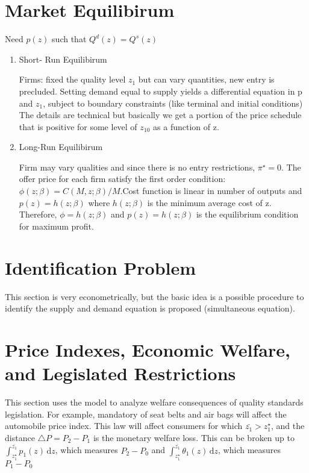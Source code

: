 \documentclass[11pt]{article}
\begin{document}
\section{Market Equilibirum}
Need $p\left(z\right)$ such that $ Q^{d}\left(z\right) = Q^{s}\left(z\right)$
\begin{enumerate} [A]
	\item Short- Run Equilibirum
	
	Firms: fixed the quality level $z_1$ but can vary quantities, new entry is precluded. 
	Setting demand equal to supply yields a differential equation in p and $z_1$, subject to boundary constraints (like terminal and initial conditions)
	The details are technical but basically we get a portion of the price schedule that is positive for some level of $z_{10}$ as a function of z.
	
	\item Long-Run Equilibirum
	
	Firm may vary qualities and since there is no entry restrictions, $\pi^{\star} = 0$. The offer price for each firm satisfy the first order condition: $\phi \left(z;\beta\right) =  C\left( M,z;\beta\right)/M$.Cost function is linear in number of outputs and $p\left(z\right) = h\left(z;\beta\right)$ where $h\left(z;\beta\right)$ is the minimum average cost of z. Therefore, $\phi = h\left(z;\beta\right)$ and $ p\left(z\right) = h\left(z;\beta\right)$ is the equilibrium condition for maximum profit.
\end {enumerate}

\section{Identification Problem} 
This section is very econometrically, but the basic idea is a possible procedure to identify the supply and demand equation is proposed (simultaneous equation). 

\section{Price Indexes, Economic Welfare, and Legislated Restrictions}
This section uses the model to analyze welfare consequences of quality standards legislation. For example, mandatory of seat belts and air bags will affect the automobile price index. 
This law will affect consumers for which $\bar{z_1} > z_1^{\star}$, and the distance $\triangle P = P_2 - P_1$ is the monetary welfare loss. This can be broken up to  $\int_{z_1^{\star}}^{\bar{z_1}} \! p_1(z) \, \mathrm{d} z$, which measures $P_2 - P_0$ and  $\int_{z_1^{\star}}^{\bar{z_1}} \! \theta_1(z) \, \mathrm{d} z$, which measures $P_1 - P_0$
\end{document}
